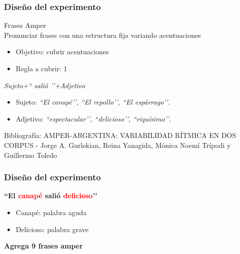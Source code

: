 \documentclass[mathserif]{beamer}%
\begin{document}
\begin{frame}
\frametitle{Diseño del experimento}
	{\Large Frases Amper} \\
	Pronunciar frases con una estructura fija variando acentuaciones
	
	\begin{itemize}
		\item Objetivo: cubrir acentuaciones
		\item Regla a cubrir: 1
	\end{itemize}
	
{\footnotesize 	
	\begin{center}
		\textit{Sujeto+`` salió ’’+Adjetivo} 
	
		\begin{itemize}
			\item Sujeto: \textit{``El canapé’’, ``El repollo’’, ``El espárrago’’}.
			\item Adjetivo: \textit{``espectacular’’, ``delicioso’’, ``riquísimo’’}.
		\end{itemize}
		
	\end{center}
}

{\tiny Bibliografía: AMPER-ARGENTINA: VARIABILIDAD RÍTMICA EN DOS CORPUS - Jorge A. Gurlekian, Reina Yanagida, Mónica Noemí Trípodi y Guillermo Toledo}
\end{frame} 

\begin{frame}
	\frametitle{Diseño del experimento}

	\begin{center}
		\textbf{``El \textcolor{red}{canapé} salió \textcolor{red}{delicioso}’’}
	\end{center}
	
	\begin{itemize}
		\item Canapé: palabra aguda
		\item Delicioso: palabra grave
	\end{itemize}
	
	
	\textbf{Agrega 9 frases amper}
\end{frame} 
\end{document}
